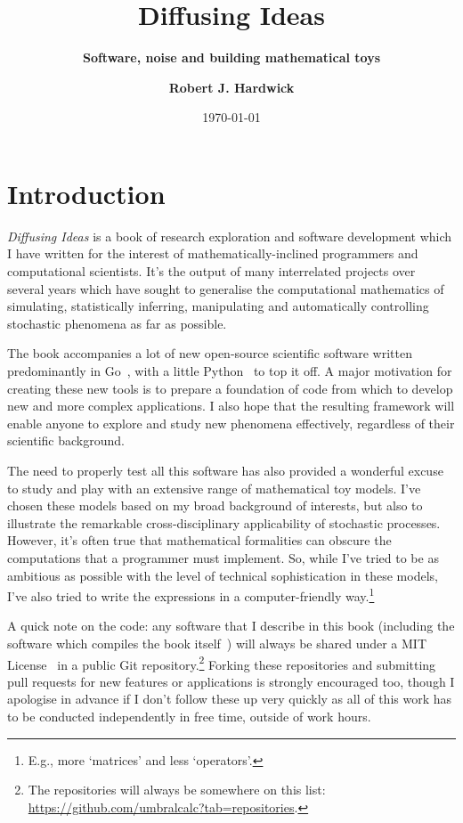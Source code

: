 \documentclass{book}
\title{\Huge \bfseries\sffamily Diffusing Ideas}
\subtitle{\Large \bfseries\sffamily \color{gray75} Software, noise and building mathematical toys}
\author{\bfseries\sffamily Robert J. Hardwick}
\date{\today}
\begin{document}
\maketitle
\frontmatter

\chapter*{Introduction}

\emph{Diffusing Ideas} is a book of research exploration and software development which I have written for the interest of mathematically-inclined programmers and computational scientists. It's the output of many interrelated projects over several years which have sought to generalise the computational mathematics of simulating, statistically inferring, manipulating and automatically controlling stochastic phenomena as far as possible.

The book accompanies a lot of new open-source scientific software written predominantly in Go~\cite{golang}, with a little Python~\cite{pythonlang} to top it off. A major motivation for creating these new tools is to prepare a foundation of code from which to develop new and more complex applications. I also hope that the resulting framework will enable anyone to explore and study new phenomena effectively, regardless of their scientific background.

The need to properly test all this software has also provided a wonderful excuse to study and play with an extensive range of mathematical toy models. I've chosen these models based on my broad background of interests, but also to illustrate the remarkable cross-disciplinary applicability of stochastic processes. However, it's often true that mathematical formalities can obscure the computations that a programmer must implement. So, while I've tried to be as ambitious as possible with the level of technical sophistication in these models, I've also tried to write the expressions in a computer-friendly way.\footnote{E.g., more `matrices' and less `operators'.}

A quick note on the code: any software that I describe in this book (including the software which compiles the book itself~\cite{diffusingideasbookgithub}) will always be shared under a MIT License~\cite{mitlicense} in a public Git repository.\footnote{The repositories will always be somewhere on this list: \href{https://github.com/umbralcalc?tab=repositories}{https://github.com/umbralcalc?tab=repositories}.} Forking these repositories and submitting pull requests for new features or applications is strongly encouraged too, though I apologise in advance if I don't follow these up very quickly as all of this work has to be conducted independently in free time, outside of work hours.
\end{document}
